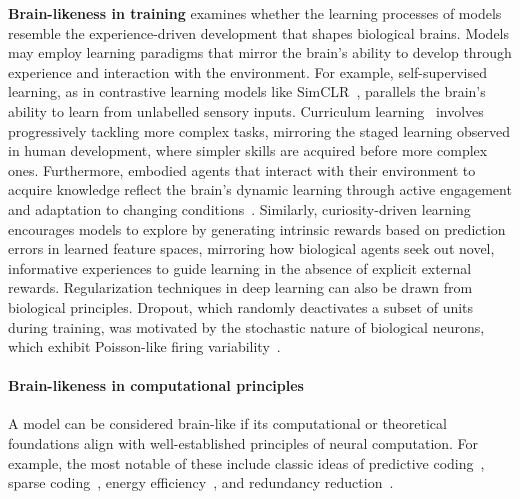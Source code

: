 \textbf{Brain-likeness in training} examines whether the learning processes of models resemble the experience-driven development that shapes biological brains. Models may employ learning paradigms that mirror the brain’s ability to develop through experience and interaction with the environment. For example, self-supervised learning, as in contrastive learning models like SimCLR~\citep{chen2020simple}, parallels the brain’s ability to learn from unlabelled sensory inputs. Curriculum learning~\citep{bengio2009curriculum} involves progressively tackling more complex tasks, mirroring the staged learning observed in human development, where simpler skills are acquired before more complex ones. Furthermore, embodied agents that interact with their environment to acquire knowledge reflect the brain's dynamic learning through active engagement and adaptation to changing conditions~\citep{pfeifer2006body}. Similarly, curiosity-driven learning~\citep{pathak2017curiosity} encourages models to explore by generating intrinsic rewards based on prediction errors in learned feature spaces, mirroring how biological agents seek out novel, informative experiences to guide learning in the absence of explicit external rewards. Regularization techniques in deep learning can also be drawn from biological principles. Dropout, which randomly deactivates a subset of units during training, was motivated by the stochastic nature of biological neurons, which exhibit Poisson-like firing variability~\citep{hinton2012improving}.

\paragraph{Brain-likeness in computational principles} 
A model can be considered brain-like if its computational or theoretical foundations align with well-established principles of neural computation. 
For example, the most notable of these include classic ideas of predictive coding~\citep{rao1999predictive}, sparse coding~\citep{olshausen1996emergence}, energy efficiency~\citep{laughlin2001energy}, and redundancy reduction~\citep{barlow1961possible}.


